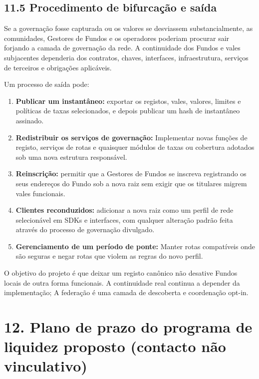 \documentclass[11pt]{article}
\begin{document}
\subsection*{11.5 Procedimento de bifurcação e saída}

Se a governação fosse capturada ou os valores se desviassem substancialmente, as comunidades, Gestores de Fundos e os operadores poderiam procurar sair forjando a camada de governação da rede. A continuidade dos Fundos e vales subjacentes dependeria dos contratos, chaves, interfaces, infraestrutura, serviços de terceiros e obrigações aplicáveis.

Um processo de saída pode:

\begin{enumerate}[leftmargin=*]
\item \textbf{Publicar um instantâneo:} exportar os registos, vales, valores, limites e políticas de taxas selecionados, e depois publicar um hash de instantâneo assinado.
\item \textbf{Redistribuir os serviços de governação:} Implementar novas funções de registo, serviços de rotas e quaisquer módulos de taxas ou cobertura adotados sob uma nova estrutura responsável.
\item \textbf{Reinscrição:} permitir que a Gestores de Fundos se inscreva registrando os seus endereços do Fundo sob a nova raiz sem exigir que os titulares migrem vales funcionais.
\item \textbf{Clientes reconduzidos:} adicionar a nova raiz como um perfil de rede selecionável em SDKs e interfaces, com qualquer alteração padrão feita através do processo de governação divulgado.
\item \textbf{Gerenciamento de um período de ponte:} Manter rotas compatíveis onde são seguras e negar rotas que violem as regras do novo perfil.
\end{enumerate}
O objetivo do projeto é que deixar um registo canônico não desative Fundos locais de outra forma funcionais. A continuidade real continua a depender da implementação; A federação é uma camada de descoberta e coordenação opt-in.


\section*{12. Plano de prazo do programa de liquidez proposto (contacto não vinculativo)}
\end{document}
